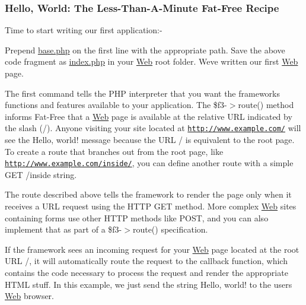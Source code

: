 \subsubsection*{Hello, World\+: The Less-\/\+Than-\/\+A-\/\+Minute Fat-\/\+Free Recipe}

Time to start writing our first application\+:-\/




Prepend {\ttfamily \hyperlink{base_8php_source}{base.\+php}} on the first line with the appropriate path. Save the above code fragment as {\ttfamily \hyperlink{index_8php_source}{index.\+php}} in your \hyperlink{class_web}{Web} root folder. We\textquotesingle{}ve written our first \hyperlink{class_web}{Web} page.

The first command tells the P\+HP interpreter that you want the framework\textquotesingle{}s functions and features available to your application. The {\ttfamily \$f3-\/$>$route()} method informs Fat-\/\+Free that a \hyperlink{class_web}{Web} page is available at the relative U\+RL indicated by the slash ({\ttfamily /}). Anyone visiting your site located at {\ttfamily \href{http://www.example.com/}{\tt http\+://www.\+example.\+com/}} will see the {\ttfamily \textquotesingle{}Hello, world!\textquotesingle{}} message because the U\+RL {\ttfamily /} is equivalent to the root page. To create a route that branches out from the root page, like {\ttfamily \href{http://www.example.com/inside/}{\tt http\+://www.\+example.\+com/inside/}}, you can define another route with a simple {\ttfamily G\+ET /inside} string.

The route described above tells the framework to render the page only when it receives a U\+RL request using the H\+T\+TP {\ttfamily G\+ET} method. More complex \hyperlink{class_web}{Web} sites containing forms use other H\+T\+TP methods like {\ttfamily P\+O\+ST}, and you can also implement that as part of a {\ttfamily \$f3-\/$>$route()} specification.

If the framework sees an incoming request for your \hyperlink{class_web}{Web} page located at the root U\+RL {\ttfamily /}, it will automatically route the request to the callback function, which contains the code necessary to process the request and render the appropriate H\+T\+ML stuff. In this example, we just send the string {\ttfamily \textquotesingle{}Hello, world!\textquotesingle{}} to the user\textquotesingle{}s \hyperlink{class_web}{Web} browser.

